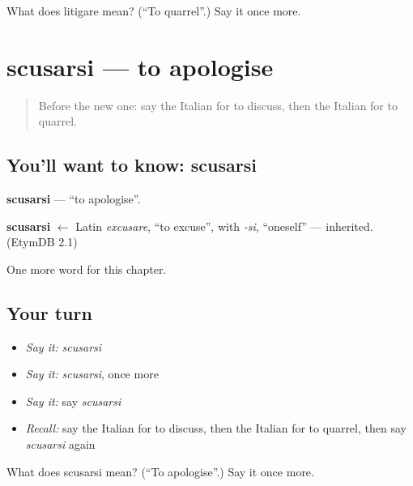 \begin{tcolorbox}[breakable,colback=teal!4,colframe=teal!35!black,title={Before you move on}]
What does litigare mean? (\textquotedblleft{}To quarrel\textquotedblright{}.) Say it once more.
\end{tcolorbox}
\section[scusarsi]{scusarsi — to apologise}

\label{lesson:IT-C143-scusarsi}



\begin{quote}
Before the new one: say the Italian for to discuss, then the Italian for to quarrel.
\end{quote}

\subsection*{You'll want to know: scusarsi}
\textbf{scusarsi} — \textquotedblleft{}to apologise\textquotedblright{}.

\begin{cousinweb}
\textbf{scusarsi} $\leftarrow$ Latin \emph{excusare}, \textquotedblleft{}to excuse\textquotedblright{}, with \emph{-si}, \textquotedblleft{}oneself\textquotedblright{} — inherited. (EtymDB 2.1)
\end{cousinweb}

\begin{grammarlens}[title={What you've built}]
One more word for this chapter.
\end{grammarlens}

\subsection*{Your turn}
\begin{itemize}
\raggedright
  \item \emph{Say it:} \emph{scusarsi}
  \item \emph{Say it:} \emph{scusarsi}, once more
  \item \emph{Say it:} say \emph{scusarsi}
  \item \emph{Recall:} say the Italian for to discuss, then the Italian for to quarrel, then say \emph{scusarsi} again
\end{itemize}

\begin{tcolorbox}[breakable,colback=teal!4,colframe=teal!35!black,title={Before you move on}]
What does scusarsi mean? (\textquotedblleft{}To apologise\textquotedblright{}.) Say it once more.
\end{tcolorbox}
